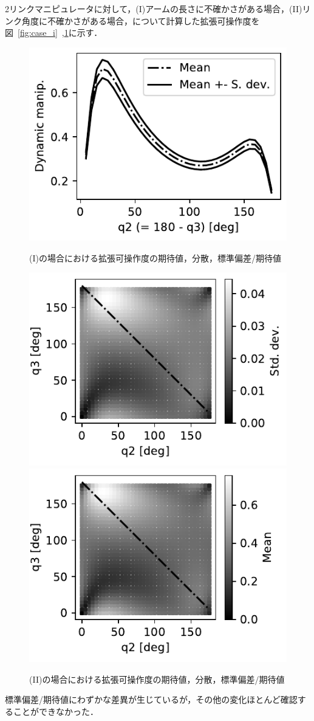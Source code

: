\documentclass[10pt,a4j,twocolumn]{ltjsarticle}
\begin{document}
2リンクマニピュレータに対して，(I)アームの長さに不確かさがある場合，(II)リンク角度に不確かさがある場合，について計算した拡張可操作度を図~\ref{fig:case_i}~,\ref{fig:case_ii}に示す．
\begin{figure}
  \centering
  \includegraphics[width=80truemm]{./dm_dist.pdf}
  \caption{(I)の場合における拡張可操作度の期待値，分散，標準偏差/期待値}
  \label{fig:case_i}
  \includegraphics[width=80truemm]{./dm_std.pdf}
  \includegraphics[width=80truemm]{./dm_mean.pdf}
  \caption{(II)の場合における拡張可操作度の期待値，分散，標準偏差/期待値}
  \label{fig:case_ii}
\end{figure}
標準偏差/期待値にわずかな差異が生じているが，その他の変化ほとんど確認することができなかった．
\end{document}
